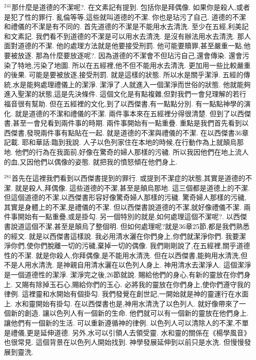 \documentclass{book}
\begin{document}
$^{241}$那什麼是道德的不潔呢?.
在文素記有提到.
包括你是拜偶像.
如果你是殺人,或者是犯了性的罪行.
亂倫等等,這些就叫道德的不潔.
你也是玷污了自己.
道德的不潔和禮儀的不潔是有不同的.
首先道德的不潔是不能用水去清洗.
至少在五經,利美記和文素記.
我們看不到道德的不潔是可以用水去清洗.
是沒有辦法用水去清洗.
那人面對道德的不潔.
他的處理方法就是他要接受刑罰.
他可能要贖罪,甚至嚴重一點,他要被放逐.
那為什麼要放逐呢?.
因為道德的不潔會不但玷污自己,還會傳染.
還會污染了特地,污染了地圖.
所以在五經裡,他不但不能用水去清洗.
更加用一些比較嚴重的後果.
可能是要被放逐,接受刑罰.
就是這樣的狀態.
所以水是關乎潔淨.
五經的傳統,水是能夠處理禮儀上的潔淨.
潔淨了,人就進入一個潔淨而世俗的狀態.
他就能夠進入聖潔的狀態,這是先決條件.
這個文化是有點複雜,但對我們一會兒理解的若行福音很有幫助.
但在五經裡的文化,到了以西傑書,有一點點分別.
有一點點神學的演化.
就是道德的不潔和禮儀的不潔.
兩件事本來在五經裡分得很清楚.
但到了以西傑書,甚至一會兒看到兩件事的時期.
兩件事開始有一點重疊.
重點是我們首先看到以西傑書,發現兩件事有點貼在一起.
就是道德的不潔與禮儀的不潔.
在以西傑書36章記載.
耶和華話:臨到我說.
人子以色列家住在本地的時候,在行動作為上就顛烏那地.
他們的行為在我面前,好像在驚奇的婦人那樣的污穢.
所以我因他們在地上流人的血,又因他們以偶像的姿態.
就把我的憤怒傾在他們身上.

$^{281}$首先在這裡我們看到以西傑書提到的罪行.
或提到不潔症的狀態,其實是道德的不潔.
就是殺人,拜偶像.
這些道德的不潔,甚至是顛烏那地.
這三個都是道德上的不潔.
但這個道德的不潔,以西傑書形容好像驚奇婦人那樣的污穢.
驚奇婦人那樣的污穢,其實是身體上的不潔,是禮儀的不潔.
但以西傑書說道德的不潔,就好像禮儀不潔.
兩件事開始有一點重疊,或是掛勾.
另一個特別的就是,如何處理這個不潔呢?.
以西傑書說道這個不潔,甚至是顛烏了整個明.
但如何處理呢?就是36章25節,都是我們熟悉的經文.
就是以西傑書這樣說.
我必用清水灑在你們身上,你們就潔淨你們.
我要潔淨你們,使你們脫離一切的污穢,棄掉一切的偶像.
我們剛剛說了,在五經裡,關乎道德性的不潔.
就是你殺人,你拜偶像,是不能用水清洗.
但在以西傑書,能夠用水清洗,但不是人用水清洗.
是神親自用清水灑在以色列人身上.
神用清水去潔淨人.
這個潔淨是一個道德性的潔淨.
潔淨完之後,26節就說.
賜給他們的身心,有新的靈放在你們身上.
又賜有除掉玉石心,賜給你們的玉心.
必將我的靈放在你們身上,使你們遵守我的律例.
這裡靈和水開始有個掛勾.
我們發覺在創世記,一開始就是神的靈運行在水面上.
水和靈開始有掛勾.
在以西傑書也是,神用水清洗了以色列人.
就好像帶來了一個新的創造.
讓以色列人有一個新的生命.
他們就可以有一個新的靈放在他們身上.
讓他們有一個新的生活.
可以重新遵循神的律例.
以色列人可以清除人的不潔,不單是禮儀,更是延伸道德.
另外,水可以引領人去領受靈.
水和靈的關係在《楊學風音》也很常見.
這個背景在以色列人開始找到.
神學發展延伸到以前只是水洗.
但慢慢發展到靈洗.
\end{document}
